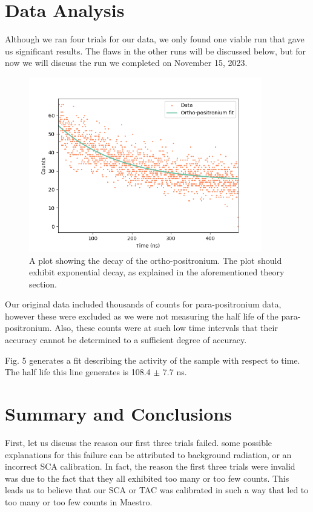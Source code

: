 \documentclass[10pt,letterpaper]{article}
\begin{document}
\section{Data Analysis}
Although we ran four trials for our data, we only found one viable run that gave us significant results. The flaws
in the other runs will be discussed below, but for now we will discuss the run we completed on November 15, 2023.
\begin{figure}[!htbp]
    \begin{center}
        \includegraphics[width=4in, angle=0]{Figure_4.png}
        \caption{A plot showing the decay of the ortho-positronium. The plot should exhibit exponential decay, as explained in the aforementioned theory section.}
    \end{center}
\end{figure}
Our original data included thousands of counts for para-positronium data, however these were excluded as we were not measuring the half life of the para-positronium. 
Also, these counts were at such low time intervals that their accuracy cannot be determined to a sufficient degree of accuracy.

Fig. 5 generates a fit describing the activity of the sample with respect to time. The half life this line generates is 108.4 $\pm$ 7.7 ns.


\section{Summary and Conclusions}
First, let us discuss the reason our first three trials failed. some possible explanations for this failure can be attributed to background radiation, or an incorrect SCA calibration. 
In fact, the reason the first three trials were invalid was due to the fact that they all exhibited too many or too few counts. This leads us to believe that our SCA or TAC was calibrated in such a way
that led to too many or too few counts in Maestro.
\end{document}
